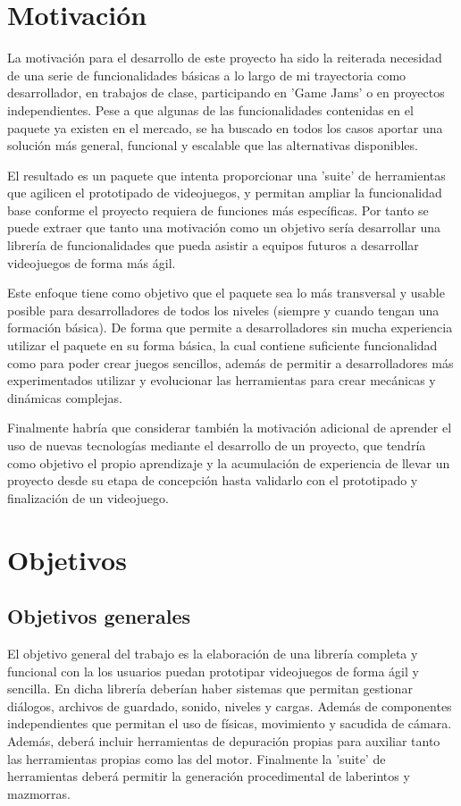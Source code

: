 \section{Motivación}

La motivación para el desarrollo de este proyecto ha sido la reiterada necesidad de una serie de funcionalidades básicas a lo largo de mi trayectoria como desarrollador,
 en trabajos de clase, participando en 'Game Jams' o en proyectos independientes. Pese a que algunas de las funcionalidades contenidas en el paquete ya existen en el mercado,
 se ha buscado en todos los casos aportar una solución más general, funcional y escalable que las alternativas disponibles. 
 
 El resultado es un paquete que intenta proporcionar
 una 'suite' de herramientas que agilicen el prototipado de videojuegos, y permitan ampliar la funcionalidad base conforme el proyecto requiera de funciones más específicas. 
 Por tanto se puede extraer que tanto una motivación como un objetivo sería desarrollar una librería de funcionalidades que pueda asistir a equipos futuros a desarrollar
 videojuegos de forma más ágil.

Este enfoque tiene como objetivo que el paquete sea lo más transversal y usable posible para desarrolladores de todos los niveles (siempre y cuando tengan una formación básica).
 De forma que permite a desarrolladores sin mucha experiencia utilizar el paquete en su forma básica, la cual contiene suficiente funcionalidad como para poder crear juegos
 sencillos, además de permitir a desarrolladores más experimentados utilizar y evolucionar las herramientas para crear mecánicas y dinámicas complejas.
 
 Finalmente habría que considerar también la motivación adicional de aprender el uso de nuevas tecnologías mediante el desarrollo de un proyecto, que tendría como objetivo el
  propio aprendizaje y la acumulación de experiencia de llevar un proyecto desde su etapa de concepción hasta validarlo con el prototipado y finalización de un videojuego. 

\section{Objetivos}
\subsection{Objetivos generales}
El objetivo general del trabajo es la elaboración de una librería completa y funcional con la los usuarios puedan prototipar videojuegos de forma ágil y sencilla. 
 En dicha librería deberían haber sistemas que permitan gestionar diálogos, archivos de guardado, sonido, niveles y cargas. Además de componentes independientes que permitan 
 el uso de físicas, movimiento y sacudida de cámara. Además, deberá incluir herramientas de depuración propias para auxiliar tanto las herramientas propias como las del motor. 
 Finalmente la 'suite' de herramientas deberá permitir la generación procedimental de laberintos y mazmorras.

